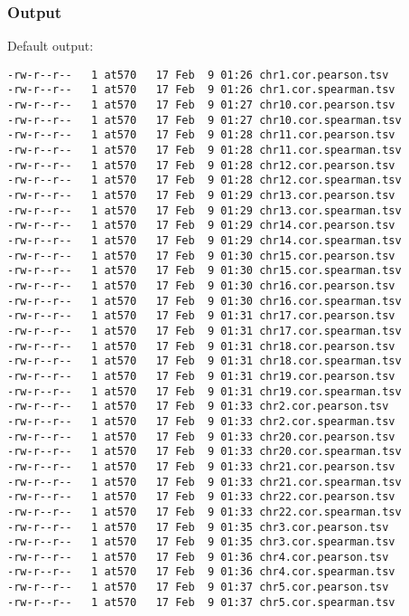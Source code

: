 \subsubsection{Output} %
Default output: %
\begin{lstlisting}
-rw-r--r--   1 at570   17 Feb  9 01:26 chr1.cor.pearson.tsv
-rw-r--r--   1 at570   17 Feb  9 01:26 chr1.cor.spearman.tsv
-rw-r--r--   1 at570   17 Feb  9 01:27 chr10.cor.pearson.tsv
-rw-r--r--   1 at570   17 Feb  9 01:27 chr10.cor.spearman.tsv
-rw-r--r--   1 at570   17 Feb  9 01:28 chr11.cor.pearson.tsv
-rw-r--r--   1 at570   17 Feb  9 01:28 chr11.cor.spearman.tsv
-rw-r--r--   1 at570   17 Feb  9 01:28 chr12.cor.pearson.tsv
-rw-r--r--   1 at570   17 Feb  9 01:28 chr12.cor.spearman.tsv
-rw-r--r--   1 at570   17 Feb  9 01:29 chr13.cor.pearson.tsv
-rw-r--r--   1 at570   17 Feb  9 01:29 chr13.cor.spearman.tsv
-rw-r--r--   1 at570   17 Feb  9 01:29 chr14.cor.pearson.tsv
-rw-r--r--   1 at570   17 Feb  9 01:29 chr14.cor.spearman.tsv
-rw-r--r--   1 at570   17 Feb  9 01:30 chr15.cor.pearson.tsv
-rw-r--r--   1 at570   17 Feb  9 01:30 chr15.cor.spearman.tsv
-rw-r--r--   1 at570   17 Feb  9 01:30 chr16.cor.pearson.tsv
-rw-r--r--   1 at570   17 Feb  9 01:30 chr16.cor.spearman.tsv
-rw-r--r--   1 at570   17 Feb  9 01:31 chr17.cor.pearson.tsv
-rw-r--r--   1 at570   17 Feb  9 01:31 chr17.cor.spearman.tsv
-rw-r--r--   1 at570   17 Feb  9 01:31 chr18.cor.pearson.tsv
-rw-r--r--   1 at570   17 Feb  9 01:31 chr18.cor.spearman.tsv
-rw-r--r--   1 at570   17 Feb  9 01:31 chr19.cor.pearson.tsv
-rw-r--r--   1 at570   17 Feb  9 01:31 chr19.cor.spearman.tsv
-rw-r--r--   1 at570   17 Feb  9 01:33 chr2.cor.pearson.tsv
-rw-r--r--   1 at570   17 Feb  9 01:33 chr2.cor.spearman.tsv
-rw-r--r--   1 at570   17 Feb  9 01:33 chr20.cor.pearson.tsv
-rw-r--r--   1 at570   17 Feb  9 01:33 chr20.cor.spearman.tsv
-rw-r--r--   1 at570   17 Feb  9 01:33 chr21.cor.pearson.tsv
-rw-r--r--   1 at570   17 Feb  9 01:33 chr21.cor.spearman.tsv
-rw-r--r--   1 at570   17 Feb  9 01:33 chr22.cor.pearson.tsv
-rw-r--r--   1 at570   17 Feb  9 01:33 chr22.cor.spearman.tsv
-rw-r--r--   1 at570   17 Feb  9 01:35 chr3.cor.pearson.tsv
-rw-r--r--   1 at570   17 Feb  9 01:35 chr3.cor.spearman.tsv
-rw-r--r--   1 at570   17 Feb  9 01:36 chr4.cor.pearson.tsv
-rw-r--r--   1 at570   17 Feb  9 01:36 chr4.cor.spearman.tsv
-rw-r--r--   1 at570   17 Feb  9 01:37 chr5.cor.pearson.tsv
-rw-r--r--   1 at570   17 Feb  9 01:37 chr5.cor.spearman.tsv

\end{lstlisting}
